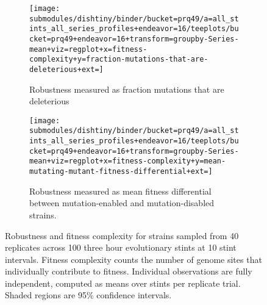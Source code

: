 \begin{figure}
\begin{center}

\begin{subfigure}[b]{\textwidth}
\centering
\texttt{[image: submodules/dishtiny/binder/bucket=prq49/a=all\_stints\_all\_series\_profiles+endeavor=16/teeplots/bucket=prq49+endeavor=16+transform=groupby-Series-mean+viz=regplot+x=fitness-complexity+y=fraction-mutations-that-are-deleterious+ext=]}%
\caption{
Robustness measured as fraction mutations that are deleterious
}
\label{fig:robustness-vs-fitness-complexity-fraction-mutations-that-are-deleterious}
\end{subfigure}

\begin{subfigure}[b]{\columnwidth}
\centering
\texttt{[image: submodules/dishtiny/binder/bucket=prq49/a=all\_stints\_all\_series\_profiles+endeavor=16/teeplots/bucket=prq49+endeavor=16+transform=groupby-Series-mean+viz=regplot+x=fitness-complexity+y=mean-mutating-mutant-fitness-differential+ext=]}
\caption{
Robustness measured as mean fitness differential between mutation-enabled and mutation-disabled strains.
}
\label{fig:robustness-vs-fitness-complexity-mean-mutating-mutant-fitness-differential}
\end{subfigure}

\caption{
Robustness and fitness complexity for strains sampled from 40 replicates across 100 three hour evolutionary stints at 10 stint intervals.
Fitness complexity counts the number of genome sites that individually contribute to fitness.
Individual observations are fully independent, computed as means over stints per replicate trial.
Shaded regions are 95\% confidence intervals.
}
\label{fig:robustness-vs-fitness-complexity}

\end{center}
\end{figure}
